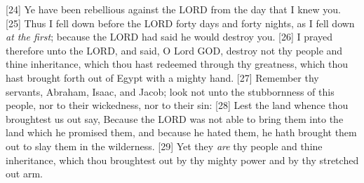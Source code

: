 [24] \textcolor[rgb]{0.00,0.00,1.00}{Ye have been rebellious against the LORD from the day that I knew you.}
[25] \textcolor[rgb]{0.00,0.00,1.00}{Thus I fell down before the LORD forty days and forty nights, as I fell down \emph{at the first}; because the LORD had said he would destroy you.}
[26] \textcolor[rgb]{0.00,0.00,1.00}{I prayed therefore unto the LORD, and said, O Lord GOD, destroy not thy people and thine inheritance, which thou hast redeemed through thy greatness, which thou hast brought forth out of Egypt with a mighty hand.}
[27] \textcolor[rgb]{0.00,0.00,1.00}{Remember thy servants, Abraham, Isaac, and Jacob; look not unto the stubbornness of this people, nor to their wickedness, nor to their sin:}
[28] \textcolor[rgb]{0.00,0.00,1.00}{Lest the land whence thou broughtest us out say, Because the LORD was not able to bring them into the land which he promised them, and because he hated them, he hath brought them out to slay them in the wilderness.}
[29] \textcolor[rgb]{0.00,0.00,1.00}{Yet they \emph{are} thy people and thine inheritance, which thou broughtest out by thy mighty power and by thy stretched out arm.}
\newpage

